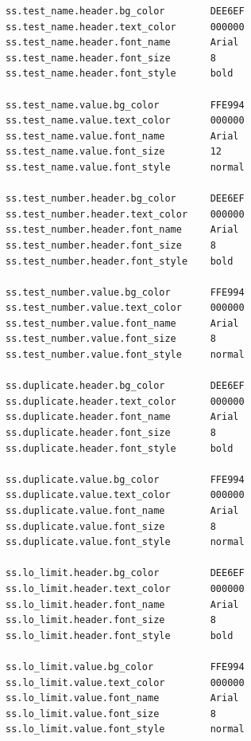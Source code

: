 \documentclass[letterpaper]{article}
\begin{document}
\begin{verbatim}
ss.test_name.header.bg_color        DEE6EF
ss.test_name.header.text_color      000000
ss.test_name.header.font_name       Arial
ss.test_name.header.font_size       8
ss.test_name.header.font_style      bold

ss.test_name.value.bg_color         FFE994
ss.test_name.value.text_color       000000
ss.test_name.value.font_name        Arial
ss.test_name.value.font_size        12
ss.test_name.value.font_style       normal

ss.test_number.header.bg_color      DEE6EF
ss.test_number.header.text_color    000000
ss.test_number.header.font_name     Arial
ss.test_number.header.font_size     8
ss.test_number.header.font_style    bold

ss.test_number.value.bg_color       FFE994
ss.test_number.value.text_color     000000
ss.test_number.value.font_name      Arial
ss.test_number.value.font_size      8
ss.test_number.value.font_style     normal

ss.duplicate.header.bg_color        DEE6EF
ss.duplicate.header.text_color      000000
ss.duplicate.header.font_name       Arial
ss.duplicate.header.font_size       8
ss.duplicate.header.font_style      bold

ss.duplicate.value.bg_color         FFE994
ss.duplicate.value.text_color       000000
ss.duplicate.value.font_name        Arial
ss.duplicate.value.font_size        8
ss.duplicate.value.font_style       normal

ss.lo_limit.header.bg_color         DEE6EF
ss.lo_limit.header.text_color       000000
ss.lo_limit.header.font_name        Arial
ss.lo_limit.header.font_size        8
ss.lo_limit.header.font_style       bold

ss.lo_limit.value.bg_color          FFE994
ss.lo_limit.value.text_color        000000
ss.lo_limit.value.font_name         Arial
ss.lo_limit.value.font_size         8
ss.lo_limit.value.font_style        normal
\end{verbatim}
\clearpage
\end{document}
